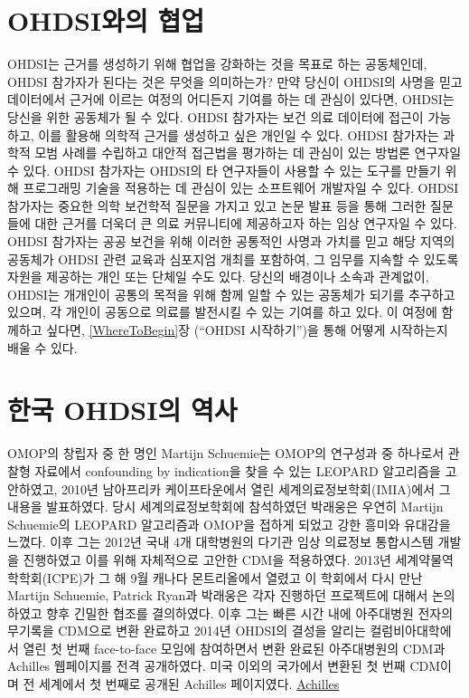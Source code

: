 \documentclass[10.5pt]{book}
\theoremstyle{definition}
\theoremstyle{definition}
\theoremstyle{definition}
\theoremstyle{remark}
\begin{document}
\hypertarget{ohdsi-}{\section{OHDSI와의 협업}\label{ohdsi-}}

OHDSI는 근거를 생성하기 위해 협업을 강화하는 것을 목표로 하는
공동체인데, OHDSI 참가자가 된다는 것은 무엇을 의미하는가? 만약 당신이
OHDSI의 사명을 믿고 데이터에서 근거에 이르는 여정의 어디든지 기여를 하는
데 관심이 있다면, OHDSI는 당신을 위한 공동체가 될 수 있다. OHDSI
참가자는 보건 의료 데이터에 접근이 가능하고, 이를 활용해 의학적 근거를
생성하고 싶은 개인일 수 있다. OHDSI 참가자는 과학적 모범 사례를 수립하고
대안적 접근법을 평가하는 데 관심이 있는 방법론 연구자일 수 있다. OHDSI
참가자는 OHDSI의 타 연구자들이 사용할 수 있는 도구를 만들기 위해
프로그래밍 기술을 적용하는 데 관심이 있는 소프트웨어 개발자일 수 있다.
OHDSI 참가자는 중요한 의학 보건학적 질문을 가지고 있고 논문 발표 등을
통해 그러한 질문들에 대한 근거를 더욱더 큰 의료 커뮤니티에 제공하고자
하는 임상 연구자일 수 있다. OHDSI 참가자는 공공 보건을 위해 이러한
공통적인 사명과 가치를 믿고 해당 지역의 공동체가 OHDSI 관련 교육과
심포지엄 개최를 포함하여, 그 임무를 지속할 수 있도록 자원을 제공하는
개인 또는 단체일 수도 있다. 당신의 배경이나 소속과 관계없이, OHDSI는
개개인이 공통의 목적을 위해 함께 일할 수 있는 공동체가 되기를 추구하고
있으며, 각 개인이 공동으로 의료를 발전시킬 수 있는 기여를 하고 있다. 이
여정에 함께하고 싶다면, \ref{WhereToBegin}장 (``OHDSI 시작하기'')을 통해
어떻게 시작하는지 배울 수 있다.

\section{한국 OHDSI의 역사}\label{-ohdsi-}

OMOP의 창립자 중 한 명인 Martijn Schuemie는 OMOP의 연구성과 중 하나로서
관찰형 자료에서 confounding by indication을 찾을 수 있는 LEOPARD
알고리즘을 고안하였고, 2010년 남아프리카 케이프타운에서 열린
세계의료정보학회(IMIA)에서 그 내용을 발표하였다. 당시 세계의료정보학회에
참석하였던 박래웅은 우연히 Martijn Schuemie의 LEOPARD 알고리즘과 OMOP을
접하게 되었고 강한 흥미와 유대감을 느꼈다. 이후 그는 2012년 국내 4개
대학병원의 다기관 임상 의료정보 통합시스템 개발을 진행하였고 이를 위해
자체적으로 고안한 CDM을 적용하였다. 2013년 세계약물역학학회(ICPE)가 그
해 9월 캐나다 몬트리올에서 열렸고 이 학회에서 다시 만난 Martijn
Schuemie, Patrick Ryan과 박래웅은 각자 진행하던 프로젝트에 대해서
논의하였고 향후 긴밀한 협조를 결의하였다. 이후 그는 빠른 시간 내에
아주대병원 전자의무기록을 CDM으로 변환 완료하고 2014년 OHDSI의 결성을
알리는 컬럼비아대학에서 열린 첫 번째 face-to-face 모임에 참여하면서 변환
완료된 아주대병원의 CDM과 Achilles 웹페이지를 전격 공개하였다. 미국
이외의 국가에서 변환된 첫 번째 CDM이며 전 세계에서 첫 번째로 공개된
Achilles 페이지였다. \href{http://ami.ajou.ac.kr:8080/}{Achilles}
\end{document}
